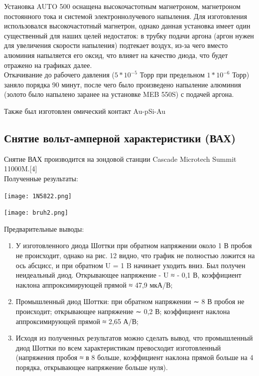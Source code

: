 \documentclass[a4paper]{article}
\begin{document}
Установка AUTO 500 оснащена высокочастотным магнетроном, магнетроном постоянного тока и системой электроннолучевого напыления. Для изготовления использовался высокочастотный магнетрон, однако данная установка имеет один существенный для наших целей недостаток: в трубку подачи аргона (аргон нужен для увеличения скорости напыления) подтекает воздух, из-за чего вместо алюминия напыляется его оксид, что влияет на качество диода, что будет отражено на графиках далее. \\

Откачивание до рабочего давления ($5*10^{-5}$ Торр при предельном $1*10^{-6}$ Торр) заняло порядка 90 минут, после чего было произведено напыление алюминия (золото было напылено заранее на установке MEB 550S) с подачей аргона.

Также был изготовлен омический контакт Au-pSi-Au

\newpage{}

\subsection{Снятие вольт-амперной характеристики (ВАХ)}

Снятие ВАХ производится на зондовой станции Cascade Microtech Summit 11000M.[4] \\
Полученные результаты:
\begin{center}
    \texttt{[image: 1N5822.png]}
\end{center}

\begin{center}
    \texttt{[image: bruh2.png]}
\end{center}

Предварительные выводы:
\begin{enumerate}
    \item У изготовленного диода Шоттки при обратном напряжении около 1 В пробоя не происходит, однако на рис. 12 видно, что график не полностью ложится на ось абсцисс, и при обратном U = 1 B начинает уходить вниз. Был получен неидеальный диод. Открывающее напряжение - U ≈ - 0,1 В, коэффициент наклона аппроксимирующей прямой ≈ 47,9 мкА/В;                              
    \item Промышленный диод Шоттки: при обратном напряжении ∼ 8 В
    пробоя не происходит; открывающее напряжение ∼ 0,2 В; коэффициент
    наклона аппроксимирующей прямой ≈ 2,65 А/В;
    \item Исходя из полученных результатов можно сделать вывод, что промышленный диод Шоттки по всем характеристикам превосходит изготовленный (напряжения пробоя ≈ в 8 больше, коэффициент наклона прямой больше на 4 порядка, открывающее напряжение больше нуля).
\end{enumerate}
\end{document}
